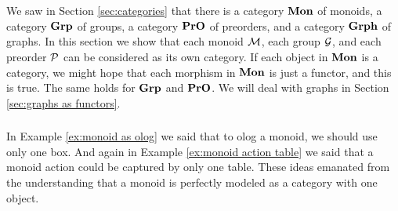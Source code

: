 \documentclass[CT4S-EN-RU]{subfiles}
\begin{document}
\section{}


\subsection{}\label{sec:mon grp pro as cat}

\begin{blockENG}
We saw in Section \ref{sec:categories} that there is a category ${\bf Mon}$ of monoids, a category ${\bf Grp}$ of groups, a category ${\bf PrO}$ of preorders, and a category ${\bf Grph}$ of graphs. In this section we show that each monoid $\mathcal{M}$, each group $\mathcal{G}$, and each preorder $\mathcal{P}$ can be considered as its own category. If each object in ${\bf Mon}$ is a category, we might hope that each morphism in ${\bf Mon}$ is just a functor, and this is true. The same holds for ${\bf Grp}$ and ${\bf PrO}$. We will deal with graphs in Section \ref{sec:graphs as functors}.
\end{blockENG}

\begin{blockRUS}
\end{blockRUS}


\subsubsection{}\label{sec:monoids as cats}

\begin{blockENG}
In Example \ref{ex:monoid as olog} we said that to olog a monoid, we should use only one box. And again in Example \ref{ex:monoid action table} we said that a monoid action could be captured by only one table. These ideas emanated from the understanding that a monoid is perfectly modeled as a category with one object. 
\end{blockENG}

\begin{blockRUS}
\end{blockRUS}
\end{document}

